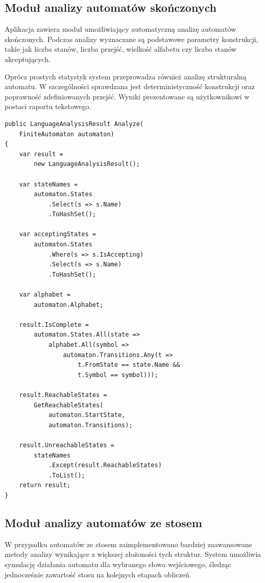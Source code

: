 \documentclass[12pt]{article}
\begin{document}
\subsection{Moduł analizy automatów skończonych}

Aplikacja zawiera moduł umożliwiający automatyczną analizę automatów skończonych. Podczas analizy wyznaczane są podstawowe parametry konstrukcji, takie jak liczba stanów, liczba przejść, wielkość alfabetu czy liczba stanów akceptujących.

Oprócz prostych statystyk system przeprowadza również analizę strukturalną automatu. W szczególności sprawdzana jest deterministyczność konstrukcji oraz poprawność zdefiniowanych przejść. Wyniki prezentowane są użytkownikowi w postaci raportu tekstowego.

\clearpage
\begin{lstlisting}[language={[Sharp]C},
caption={Przygotowanie danych automatu do analizy języka},
label={lst:automaton-analysis}]
public LanguageAnalysisResult Analyze(
    FiniteAutomaton automaton)
{
    var result =
        new LanguageAnalysisResult();

    var stateNames =
        automaton.States
            .Select(s => s.Name)
            .ToHashSet();

    var acceptingStates =
        automaton.States
            .Where(s => s.IsAccepting)
            .Select(s => s.Name)
            .ToHashSet();

    var alphabet =
        automaton.Alphabet;

    result.IsComplete =
        automaton.States.All(state =>
            alphabet.All(symbol =>
                automaton.Transitions.Any(t =>
                    t.FromState == state.Name &&
                    t.Symbol == symbol)));

    result.ReachableStates =
        GetReachableStates(
            automaton.StartState,
            automaton.Transitions);

    result.UnreachableStates =
        stateNames
            .Except(result.ReachableStates)
            .ToList();
    return result;
}
\end{lstlisting}

\subsection{Moduł analizy automatów ze stosem}

W przypadku automatów ze stosem zaimplementowano bardziej zaawansowane metody analizy wynikające z większej złożoności tych struktur. System umożliwia symulację działania automatu dla wybranego słowa wejściowego, śledząc jednocześnie zawartość stosu na kolejnych etapach obliczeń.
\end{document}
